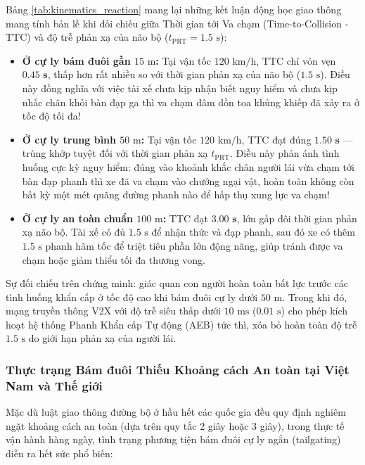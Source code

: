 \documentclass[a4paper]{article}
\begin{document}
Bảng \ref{tab:kinematics_reaction} mang lại những kết luận động học giao thông mang tính bản lề khi đối chiếu giữa Thời gian tới Va chạm (Time-to-Collision - TTC) và độ trễ phản xạ của não bộ ($t_{\text{PRT}} = 1.5\text{ s}$):
\begin{itemize}
    \item \textbf{Ở cự ly bám đuôi gần $15\text{ m}$:} Tại vận tốc $120 \text{ km/h}$, TTC chỉ vỏn vẹn $\mathbf{0.45\text{ s}}$, thấp hơn rất nhiều so với thời gian phản xạ của não bộ ($1.5\text{ s}$). Điều này đồng nghĩa với việc tài xế chưa kịp nhận biết nguy hiểm và chưa kịp nhấc chân khỏi bàn đạp ga thì va chạm đâm dồn toa khủng khiếp đã xảy ra ở tốc độ tối đa!
    \item \textbf{Ở cự ly trung bình $50\text{ m}$:} Tại vận tốc $120 \text{ km/h}$, TTC đạt đúng $\mathbf{1.50\text{ s}}$ — trùng khớp tuyệt đối với thời gian phản xạ $t_{\text{PRT}}$. Điều này phản ánh tình huống cực kỳ nguy hiểm: đúng vào khoảnh khắc chân người lái vừa chạm tới bàn đạp phanh thì xe đã va chạm vào chướng ngại vật, hoàn toàn không còn bất kỳ một mét quãng đường phanh nào để hấp thụ xung lực va chạm!
    \item \textbf{Ở cự ly an toàn chuẩn $100\text{ m}$:} TTC đạt $\mathbf{3.00\text{ s}}$, lớn gấp đôi thời gian phản xạ não bộ. Tài xế có đủ $1.5\text{ s}$ để nhận thức và đạp phanh, sau đó xe có thêm $1.5\text{ s}$ phanh hãm tốc để triệt tiêu phần lớn động năng, giúp tránh được va chạm hoặc giảm thiểu tối đa thương vong.
\end{itemize}
Sự đối chiếu trên chứng minh: giác quan con người hoàn toàn bất lực trước các tình huống khẩn cấp ở tốc độ cao khi bám đuôi cự ly dưới $50\text{ m}$. Trong khi đó, mạng truyền thông V2X với độ trễ siêu thấp dưới $10\text{ ms}$ ($0.01\text{ s}$) cho phép kích hoạt hệ thống Phanh Khẩn cấp Tự động (AEB) tức thì, xóa bỏ hoàn toàn độ trễ $1.5\text{ s}$ do giới hạn phản xạ của người lái.

\subsubsection{Thực trạng Bám đuôi Thiếu Khoảng cách An toàn tại Việt Nam và Thế giới}
Mặc dù luật giao thông đường bộ ở hầu hết các quốc gia đều quy định nghiêm ngặt khoảng cách an toàn (dựa trên quy tắc 2 giây hoặc 3 giây), trong thực tế vận hành hàng ngày, tình trạng phương tiện bám đuôi cự ly ngắn (tailgating) diễn ra hết sức phổ biến:
\end{document}
